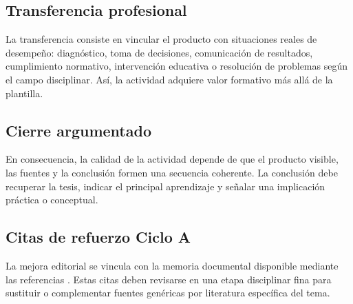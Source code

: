 \documentclass[spanish,letterpaper,oneside]{article}
\begin{document}
\subsection*{Transferencia profesional}
La transferencia consiste en vincular el producto con situaciones reales de desempeño: diagnóstico, toma de decisiones, comunicación de resultados, cumplimiento normativo, intervención educativa o resolución de problemas según el campo disciplinar. Así, la actividad adquiere valor formativo más allá de la plantilla.

\subsection*{Cierre argumentado}
En consecuencia, la calidad de la actividad depende de que el producto visible, las fuentes y la conclusión formen una secuencia coherente. La conclusión debe recuperar la tesis, indicar el principal aprendizaje y señalar una implicación práctica o conceptual.



\subsection*{Citas de refuerzo Ciclo A}
La mejora editorial se vincula con la memoria documental disponible mediante las referencias \citep{programa-inteligencia-artificial-redes-neuronales-imtc,cicloARefuerzo02,cicloARefuerzo03,cicloARefuerzo04,cicloARefuerzo05,cicloARefuerzo06}. Estas citas deben revisarse en una etapa disciplinar fina para sustituir o complementar fuentes genéricas por literatura específica del tema.
\end{document}
